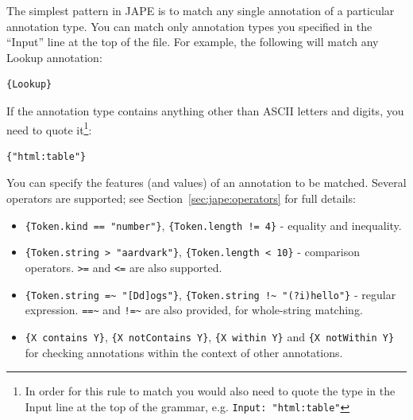 
The simplest pattern in JAPE is to match any single annotation of a particular
annotation type.  You can match only annotation types you specified in the
``Input'' line at the top of the file.  For example, the following will match
any Lookup annotation:

\begin{small}
\begin{verbatim}
{Lookup}
\end{verbatim}
\end{small}

If the annotation type contains anything other than ASCII letters and digits,
you need to quote it\footnote{In order for this rule to match you would also
need to quote the type in the Input line at the top of the grammar, e.g.
\texttt{Input: "html:table"}}:

\begin{small}
\begin{verbatim}
{"html:table"}
\end{verbatim}
\end{small}



You can specify the features (and values) of an annotation to be matched.
Several operators are supported; see Section~\ref{sec:jape:operators} for full
details:
  \begin{itemize}
  \item \verb|{Token.kind == "number"}|, \verb|{Token.length != 4}| - equality
  and inequality.
  \item \verb|{Token.string > "aardvark"}|, \verb|{Token.length < 10}| -
  comparison operators. \verb|>=| and \verb|<=| are also supported.
  \item \verb|{Token.string =~ "[Dd]ogs"}|,
  \verb|{Token.string !~ "(?i)hello"}| - regular expression.  \verb|==~| and
  \verb|!=~| are also provided, for whole-string matching.
  \item \verb|{X contains Y}|, \verb|{X notContains Y}|, \verb|{X within Y}|
  and \verb|{X notWithin Y}| for checking annotations within the context of
  other annotations.
  \end{itemize}

